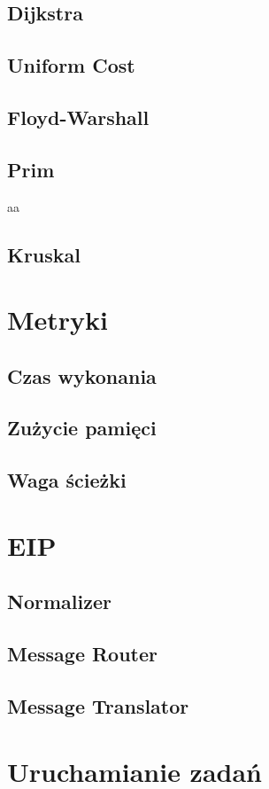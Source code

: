 \subsection{Dijkstra}

\subsection{Uniform Cost}

\subsection{Floyd-Warshall}

\subsection{Prim}
aa

\subsection{Kruskal}

\section{Metryki}

\subsection{Czas wykonania}

\subsection{Zużycie pamięci}

\subsection{Waga ścieżki}

\section{EIP}

\subsection{Normalizer}

\subsection{Message Router}

\subsection{Message Translator}

\section{Uruchamianie zadań}
